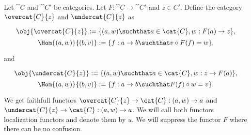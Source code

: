\begin{definition}
Let $\cat{C}$ and $\cat{C'}$ be categories. 
Let $F:\cat{C}\rightarrow \cat{C'}$ and $z\in C'$. 
Define the category $\overcat{C}{z}$ and $\undercat{C}{z}$ as 

\[\obj{\overcat{C}{z}} := \{(a,w) \suchthat a\in \cat{C}, w:F(a)\rightarrow z\},\]
\[\Hom{(a,w)}{(b,v)} := \{f:a\rightarrow b \suchthat v\circ F(f) = w  \},\]

and

\[\obj{\undercat{C}{z}} := \{(a,w) \suchthat a\in \cat{C}, w:z\rightarrow F(a)\},\]
\[\Hom{(a,w)}{(b,v)} := \{f:a\rightarrow b \suchthat F(f) \circ w = v  \}.\]

We get faithfull functors 
$\overcat{C}{z} \rightarrow \cat{C}: (a,w)\rightarrow a$ 
and 
$\undercat{C}{z} \rightarrow \cat{C}: (a,w)\rightarrow a$.
We will call both functors localization functors and denote them by $u$.
We will suppress the functor $F$ where there can be no confusion.
\end{definition}